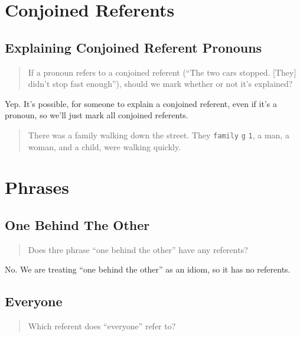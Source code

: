 \documentclass[
]{book}
\begin{document}
\hypertarget{conjoined-referents-1}{%
\section{Conjoined Referents}\label{conjoined-referents-1}}

\hypertarget{explaining-conjoined-referent-pronouns}{%
\subsection{Explaining Conjoined Referent Pronouns}\label{explaining-conjoined-referent-pronouns}}

\begin{quote}
If a pronoun refers to a conjoined referent (``The two cars stopped. {[}They{]} didn't stop fast enough''),
should we mark whether or not it's explained?
\end{quote}

Yep.
It's possible, for someone to explain a conjoined referent, even if it's a pronoun, so we'll just mark all conjoined referents.

\begin{quote}
There was a family walking down the street.
They \texttt{family} \texttt{g} \texttt{1}, a man, a woman, and a child, were walking quickly.
\end{quote}

\hypertarget{phrases}{%
\section{Phrases}\label{phrases}}

\hypertarget{one-behind-the-other}{%
\subsection{One Behind The Other}\label{one-behind-the-other}}

\begin{quote}
Does thre phrase ``one behind the other'' have any referents?
\end{quote}

No.
We are treating ``one behind the other'' as an idiom, so it has no referents.

\hypertarget{everyone}{%
\subsection{Everyone}\label{everyone}}

\begin{quote}
Which referent does ``everyone'' refer to?
\end{quote}
\end{document}
